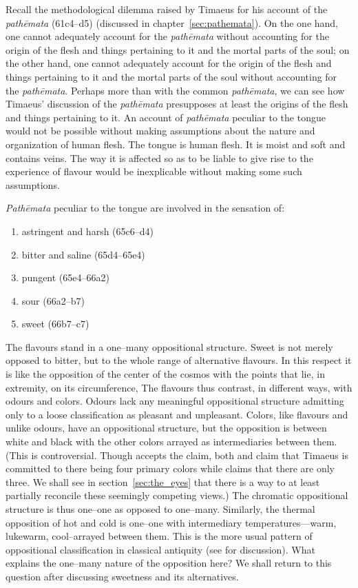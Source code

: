 Recall the methodological dilemma raised by Timaeus for his account of the \emph{pathēmata} (61c4–d5) (discussed in chapter~\ref{sec:pathemata}). On the one hand, one cannot adequately account for the \emph{pathēmata} without accounting for the origin of the flesh and things pertaining to it and the mortal parts of the soul; on the other hand, one cannot adequately account for the origin of the flesh and things pertaining to it and the mortal parts of the soul without accounting for the \emph{pathēmata}. Perhaps more than with the common \emph{pathēmata}, we can see how Timaeus' discussion of the \emph{pathēmata} presupposes at least the origins of the flesh and things pertaining to it. An account of \emph{pathēmata} peculiar to the tongue would not be possible without making assumptions about the nature and organization of human flesh. The tongue is human flesh. It is moist and soft and contains veins. The way it is affected so as to be liable to give rise to the experience of flavour would be inexplicable without making some such assumptions.

\emph{Pathēmata} peculiar to the tongue are involved in the sensation of:
\begin{enumerate}
	\item astringent and harsh (65c6--d4)
	\item bitter and saline (65d4--65e4)
	\item pungent (65e4--66a2)
	\item sour (66a2--b7)
	\item sweet (66b7--c7)
\end{enumerate}
The flavours stand in a one--many oppositional structure. Sweet is not merely opposed to bitter, but to the whole range of alternative flavours. In this respect it is like the opposition of the center of the cosmos with the points that lie, in extremity, on its circumference, The flavours thus contrast, in different ways, with odours and colors. Odours lack any meaningful oppositional structure admitting only to a loose classification as pleasant and unpleasant. Colors, like flavours and unlike odours, have an oppositional structure, but the opposition is between white and black with the other colors arrayed as intermediaries between them. (This is controversial. Though \citealt[480--1]{Taylor:1928qb} accepts the claim, both \citealt{Brisson:1997qr} and \citealt{Ierodiakonou:2005ly} claim that Timaeus is committed to there being four primary colors while \citealt[277]{Cornford:1935fk} claims that there are only three. We shall see in section~\ref{sec:the_eyes} that there is a way to at least partially reconcile these seemingly competing views.) The chromatic oppositional structure is thus one--one as opposed to one--many. Similarly, the thermal opposition of hot and cold is one--one with intermediary temperatures---warm, lukewarm, cool--arrayed between them. This is the more usual pattern of oppositional classification in classical antiquity (see \citealt{Lloyd:1966ly} for discussion). What explains the one--many nature of the opposition here? We shall return to this question after discussing sweetness and its alternatives.

